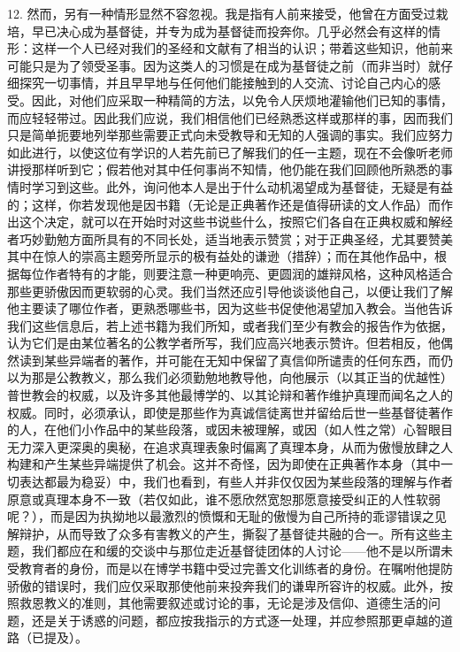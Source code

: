 12. 然而，另有一种情形显然不容忽视。我是指有人前来接受，他曾在方面受过栽培，早已决心成为基督徒，并专为成为基督徒而投奔你。几乎必然会有这样的情形：这样一个人已经对我们的圣经和文献有了相当的认识；带着这些知识，他前来可能只是为了领受圣事。因为这类人的习惯是在成为基督徒之前（而非当时）就仔细探究一切事情，并且早早地与任何他们能接触到的人交流、讨论自己内心的感受。因此，对他们应采取一种精简的方法，以免令人厌烦地灌输他们已知的事情，而应轻轻带过。因此我们应说，我们相信他们已经熟悉这样或那样的事，因而我们只是简单扼要地列举那些需要正式向未受教导和无知的人强调的事实。我们应努力如此进行，以使这位有学识的人若先前已了解我们的任一主题，现在不会像听老师讲授那样听到它；假若他对其中任何事尚不知情，他仍能在我们回顾他所熟悉的事情时学习到这些。此外，询问他本人是出于什么动机渴望成为基督徒，无疑是有益的；这样，你若发现他是因书籍（无论是正典著作还是值得研读的文人作品）而作出这个决定，就可以在开始时对这些书说些什么，按照它们各自在正典权威和解经者巧妙勤勉方面所具有的不同长处，适当地表示赞赏；对于正典圣经，尤其要赞美其中在惊人的崇高主题旁所显示的极有益处的谦逊（措辞）；而在其他作品中，根据每位作者特有的才能，则要注意一种更响亮、更圆润的雄辩风格，这种风格适合那些更骄傲因而更软弱的心灵。我们当然还应引导他谈谈他自己，以便让我们了解他主要读了哪位作者，更熟悉哪些书，因为这些书促使他渴望加入教会。当他告诉我们这些信息后，若上述书籍为我们所知，或者我们至少有教会的报告作为依据，认为它们是由某位著名的公教学者所写，我们应高兴地表示赞许。但若相反，他偶然读到某些异端者的著作，并可能在无知中保留了真信仰所谴责的任何东西，而仍以为那是公教教义，那么我们必须勤勉地教导他，向他展示（以其正当的优越性）普世教会的权威，以及许多其他最博学的、以其论辩和著作维护真理而闻名之人的权威。同时，必须承认，即使是那些作为真诚信徒离世并留给后世一些基督徒著作的人，在他们小作品中的某些段落，或因未被理解，或因（如人性之常）心智眼目无力深入更深奥的奥秘，在追求真理表象时偏离了真理本身，从而为傲慢放肆之人构建和产生某些异端提供了机会。这并不奇怪，因为即使在正典著作本身（其中一切表达都最为稳妥）中，我们也看到，有些人并非仅仅因为某些段落的理解与作者原意或真理本身不一致（若仅如此，谁不愿欣然宽恕那愿意接受纠正的人性软弱呢？），而是因为执拗地以最激烈的愤慨和无耻的傲慢为自己所持的乖谬错误之见解辩护，从而导致了众多有害教义的产生，撕裂了基督徒共融的合一。所有这些主题，我们都应在和缓的交谈中与那位走近基督徒团体的人讨论——他不是以所谓未受教育者的身份，而是以在博学书籍中受过完善文化训练者的身份。在嘱咐他提防骄傲的错误时，我们应仅采取那使他前来投奔我们的谦卑所容许的权威。此外，按照救恩教义的准则，其他需要叙述或讨论的事，无论是涉及信仰、道德生活的问题，还是关于诱惑的问题，都应按我指示的方式逐一处理，并应参照那更卓越的道路（已提及）。\par

